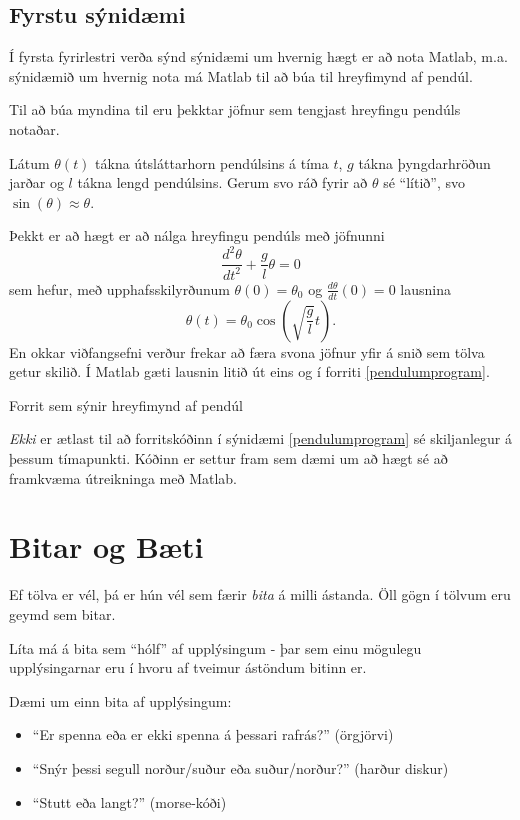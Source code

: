\documentclass[justified,nobib]{tufte-handout}
\begin{document}
\subsection{Fyrstu sýnidæmi}
Í fyrsta fyrirlestri verða sýnd sýnidæmi um hvernig hægt er að nota Matlab, m.a. sýnidæmið um hvernig nota má Matlab til að búa til hreyfimynd af pendúl.

Til að búa myndina til eru þekktar jöfnur sem tengjast hreyfingu pendúls notaðar.

Látum $\theta(t)$ tákna útsláttarhorn pendúlsins á tíma $t$, $g$ tákna þyngdarhröðun jarðar og $l$ tákna lengd pendúlsins. Gerum svo ráð fyrir að $\theta$ sé ``lítið'', svo $\sin(\theta) \approx \theta$. 

Þekkt er að hægt er að nálga hreyfingu pendúls með jöfnunni
\[
\frac{d^2\theta}{dt^2} + \frac{g}{l}\theta = 0
\]
sem hefur, með upphafsskilyrðunum $\theta(0) = \theta_0$ og $\frac{d\theta}{dt}(0)= 0$ lausnina
\[
    \theta(t) = \theta_0 \cos\left(\sqrt{\frac{g}{l}}t\right).
\]
En okkar viðfangsefni verður frekar að færa svona jöfnur yfir á snið sem tölva getur skilið. Í Matlab gæti lausnin litið út eins og í forriti \ref{pendulumprogram}.

\begin{example}
\caption{Forrit sem sýnir hreyfimynd af pendúl}
\label{pendulumprogram}
\end{example}

\emph{Ekki} er ætlast til að forritskóðinn í sýnidæmi \ref{pendulumprogram} sé skiljanlegur á þessum tímapunkti. Kóðinn er settur fram sem dæmi um að hægt sé að framkvæma útreikninga með Matlab.

\section{Bitar og Bæti}

Ef tölva er vél, þá er hún vél sem færir \emph{bita} á milli ástanda. Öll gögn í tölvum eru geymd sem bitar. 

Líta má á bita sem ``hólf'' af upplýsingum - þar sem einu mögulegu upplýsingarnar eru í hvoru af tveimur ástöndum bitinn er.

Dæmi um einn bita af upplýsingum:
\begin{itemize}
    \item ``Er spenna eða er ekki spenna á þessari rafrás?'' (örgjörvi)
    \item ``Snýr þessi segull norður/suður eða suður/norður?'' (harður diskur)
    \item ``Stutt eða langt?'' (morse-kóði)
\end{itemize}
\end{document}
